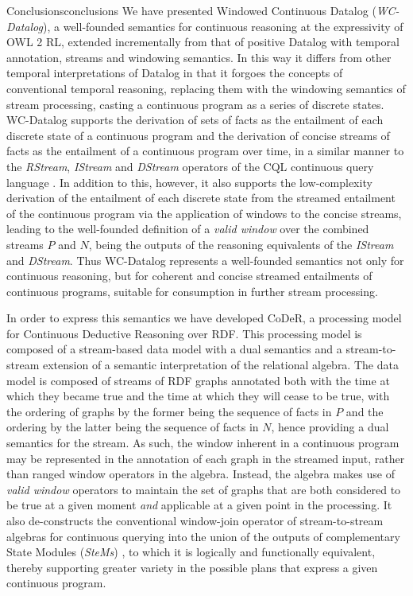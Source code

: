 \begin{nestedsection}{Conclusions}{conclusions}
	We have presented Windowed Continuous Datalog (\emph{WC-Datalog}), a well-founded semantics for continuous reasoning at the expressivity of OWL 2 RL, extended incrementally from that of positive Datalog with temporal annotation, streams and windowing semantics.
	In this way it differs from other temporal interpretations of Datalog \citep{orgun88chronolog} in that it forgoes the concepts of conventional temporal reasoning, replacing them with the windowing semantics of stream processing, casting a continuous program as a series of discrete states.
	WC-Datalog supports the derivation of sets of facts as the entailment of each discrete state of a continuous program and the derivation of concise streams of facts as the entailment of a continuous program over time, in a similar manner to the \emph{RStream}, \emph{IStream} and \emph{DStream} operators of the CQL continuous query language \citep{CQL}.
	In addition to this, however, it also supports the low-complexity derivation of the entailment of each discrete state from the streamed entailment of the continuous program via the application of windows to the concise streams, leading to the well-founded definition of a \emph{valid window} over the combined streams $P$ and $N$, being the outputs of the reasoning equivalents of the \emph{IStream} and \emph{DStream}.
	Thus WC-Datalog represents a well-founded semantics not only for continuous reasoning, but for coherent and concise streamed entailments of continuous programs, suitable for consumption in further stream processing.

	In order to express this semantics we have developed CoDeR, a processing model for Continuous Deductive Reasoning over RDF.
	This processing model is composed of a stream-based data model with a dual semantics and a stream-to-stream extension of a semantic interpretation of the relational algebra.
	The data model is composed of streams of RDF graphs annotated both with the time at which they became true and the time at which they will cease to be true, with the ordering of graphs by the former being the sequence of facts in $P$ and the ordering by the latter being the sequence of facts in $N$, hence providing a dual semantics for the stream.
	As such, the window inherent in a continuous program may be represented in the annotation of each graph in the streamed input, rather than ranged window operators in the algebra.
	Instead, the algebra makes use of \emph{valid window} operators to maintain the set of graphs that are both considered to be true at a given moment \emph{and} applicable at a given point in the processing.
	It also de-constructs the conventional window-join operator of stream-to-stream algebras for continuous querying into the union of the outputs of complementary State Modules (\emph{SteMs}) \citep{SteMs}, to which it is logically and functionally equivalent, thereby supporting greater variety in the possible plans that express a given continuous program.


\end{nestedsection}
